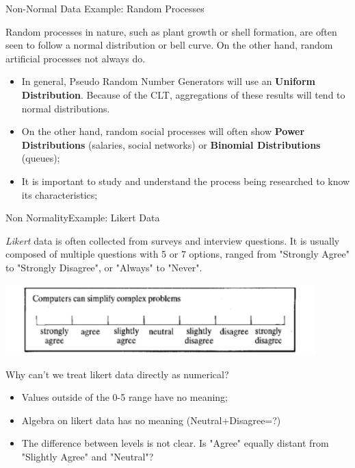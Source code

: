 \begin{frame}{Non-Normal Data Example: Random Processes}

  Random processes in nature, such as plant growth or shell formation, are often seen to follow a normal distribution or bell curve. On the other hand, random artificial processes not always do.\bigskip

  \begin{itemize}
    \item In general, Pseudo Random Number Generators will use an {\bf Uniform Distribution}. Because of the CLT, aggregations of these results will tend to normal distributions.\medskip

    \item On the other hand, random social processes will often show {\bf Power Distributions} (salaries, social networks) or {\bf Binomial Distributions} (queues);\medskip

    \item It is important to study and understand the process being researched to know its characteristics;
  \end{itemize}
\end{frame}

\begin{frame}{Non Normality}{Example: Likert Data}

\emph{Likert} data is often collected from surveys and interview questions. It
is usually  composed of multiple questions with 5 or 7 options, ranged from
"Strongly Agree" to "Strongly Disagree", or "Always" to "Never".\bigskip

\begin{center}
  \includegraphics[width=0.9\textwidth]{../img/likert_scale}
\end{center}

Why can't we treat likert data directly as numerical?
\begin{itemize}
  \item Values outside of the 0-5 range have no meaning;
  \item Algebra on likert data has no meaning (Neutral+Disagree=?)
  \item The difference between levels is not clear. Is "Agree" equally
  distant from "Slightly Agree" and "Neutral"?
\end{itemize}
\end{frame}

